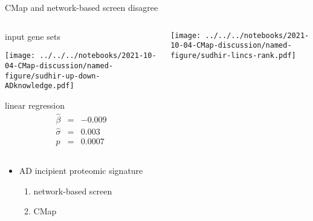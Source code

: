 \documentclass[aspectratio=169]{beamer}
\begin{document}
\begin{frame}{CMap and network-based screen disagree}
\begin{columns}[t]
\begin{column}{0.4\textwidth}
  input gene sets

  \texttt{[image: ../../../notebooks/2021-10-04-CMap-discussion/named-figure/sudhir-up-down-ADknowledge.pdf]}

  \vfill
  linear regression
  \begin{eqnarray*}
    \hat{\beta} &=& -0.009 \\
    \hat{\sigma} &=& 0.003 \\
    p &=& 0.0007
  \end{eqnarray*}
\end{column}

\begin{column}{0.4\textwidth}

  \texttt{[image: ../../../notebooks/2021-10-04-CMap-discussion/named-figure/sudhir-lincs-rank.pdf]}
\end{column}

\end{columns}
\end{frame}

\begin{frame}
  \begin{itemize}
    \item AD incipient proteomic signature
      \begin{enumerate}
        \item network-based screen
        \item CMap
      \end{enumerate}
  \end{itemize}
\end{frame}
\end{document}
